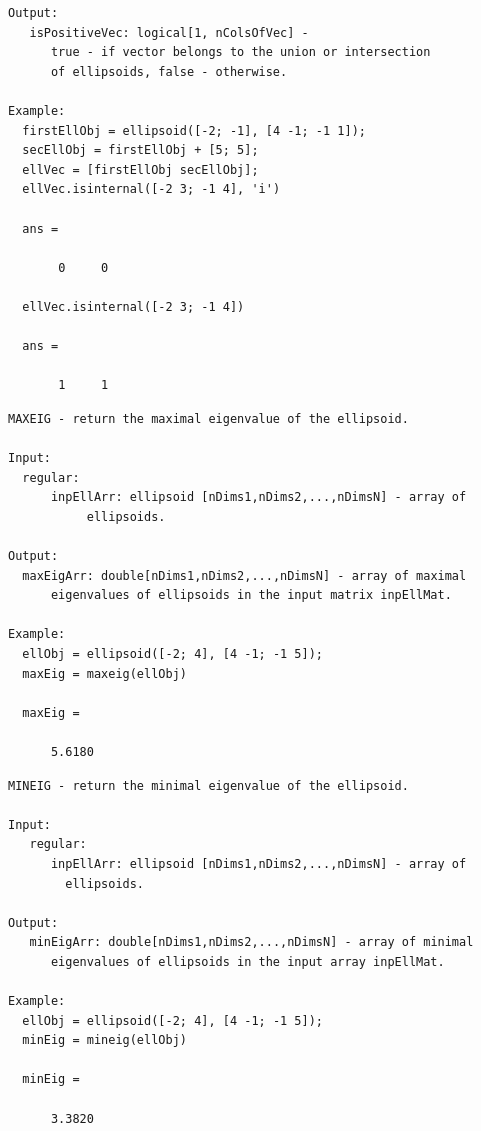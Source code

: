 \documentclass[letterpaper,10pt,english]{sphinxmanual}
\begin{document}
\begin{Verbatim}[commandchars=\\\{\}]
Output:
   isPositiveVec: logical[1, nColsOfVec] -
      true - if vector belongs to the union or intersection
      of ellipsoids, false - otherwise.

Example:
  firstEllObj = ellipsoid([-2; -1], [4 -1; -1 1]);
  secEllObj = firstEllObj + [5; 5];
  ellVec = [firstEllObj secEllObj];
  ellVec.isinternal([-2 3; -1 4], 'i')

  ans =

       0     0

  ellVec.isinternal([-2 3; -1 4])

  ans =

       1     1
\end{Verbatim}

\begin{Verbatim}[commandchars=\\\{\}]
MAXEIG - return the maximal eigenvalue of the ellipsoid.

Input:
  regular:
      inpEllArr: ellipsoid [nDims1,nDims2,...,nDimsN] - array of
           ellipsoids.

Output:
  maxEigArr: double[nDims1,nDims2,...,nDimsN] - array of maximal
      eigenvalues of ellipsoids in the input matrix inpEllMat.

Example:
  ellObj = ellipsoid([-2; 4], [4 -1; -1 5]);
  maxEig = maxeig(ellObj)

  maxEig =

      5.6180
\end{Verbatim}

\begin{Verbatim}[commandchars=\\\{\}]
MINEIG - return the minimal eigenvalue of the ellipsoid.

Input:
   regular:
      inpEllArr: ellipsoid [nDims1,nDims2,...,nDimsN] - array of
        ellipsoids.

Output:
   minEigArr: double[nDims1,nDims2,...,nDimsN] - array of minimal
      eigenvalues of ellipsoids in the input array inpEllMat.

Example:
  ellObj = ellipsoid([-2; 4], [4 -1; -1 5]);
  minEig = mineig(ellObj)

  minEig =

      3.3820
\end{Verbatim}
\end{document}
